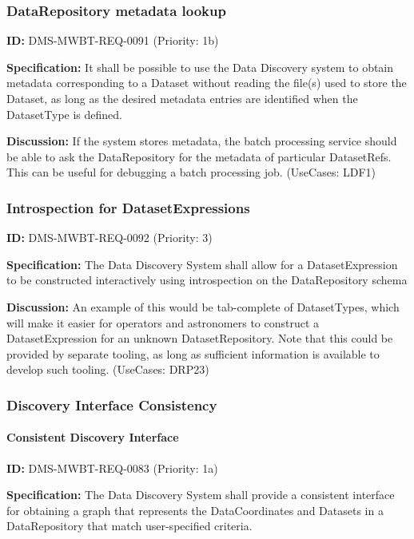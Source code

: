 \documentclass[SE,toc,lsstdraft]{lsstdoc}
\begin{document}
\subsubsection{DataRepository metadata lookup}

\label{DMS-MWBT-REQ-0091}
\textbf{ID:} DMS-MWBT-REQ-0091 (Priority: 1b)

\textbf{Specification:}
It shall be possible to use the Data Discovery system to obtain metadata corresponding to a Dataset without reading the file(s) used to store the Dataset, as long as the desired metadata entries are identified when the DatasetType is defined.

\textbf{Discussion:}
If the system stores metadata, the batch processing service should be able to ask the DataRepository for the metadata of particular DatasetRefs. This can be useful for debugging a batch processing job. (UseCases: LDF1)

\subsubsection{Introspection for DatasetExpressions}

\label{DMS-MWBT-REQ-0092}
\textbf{ID:} DMS-MWBT-REQ-0092 (Priority: 3)

\textbf{Specification:}
The Data Discovery System shall allow for a DatasetExpression to be constructed interactively using introspection on the DataRepository schema

\textbf{Discussion:}
An example of this would be tab-complete of DatasetTypes, which will make it easier for operators and astronomers to construct a DatasetExpression for an unknown DatasetRepository. Note that this could be provided by separate tooling, as long as sufficient information is available to develop such tooling. (UseCases: DRP23)

\subsubsection{Discovery Interface Consistency}

\paragraph{Consistent Discovery Interface}\hfill  %

\label{DMS-MWBT-REQ-0083}
\textbf{ID:} DMS-MWBT-REQ-0083 (Priority: 1a)

\textbf{Specification:}
The Data Discovery System shall provide a consistent interface for obtaining a graph that represents the DataCoordinates and Datasets in a DataRepository that match user-specified criteria.
\end{document}
